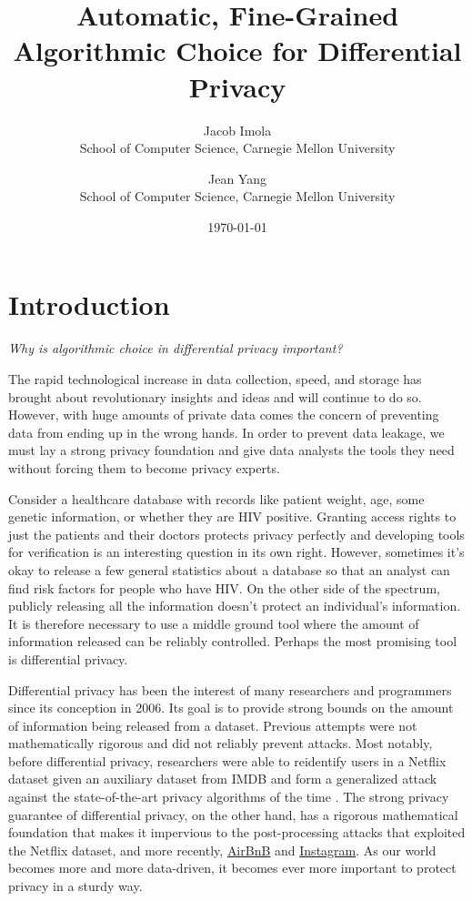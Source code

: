 \documentclass[11pt]{article}
\title{Automatic, Fine-Grained Algorithmic Choice for Differential Privacy}
\date{\today}
\author{Jacob Imola\\ School of Computer Science, Carnegie Mellon University\and Jean Yang\\ School of Computer Science, Carnegie Mellon University}
\begin{document}
\maketitle
\section{Introduction}
\emph{Why is algorithmic choice in differential privacy important?}

The rapid technological increase in data collection, speed, and storage has brought about revolutionary insights and ideas and will continue to do so. However, with huge amounts of private data comes the concern of preventing data from ending up in the wrong hands. In order to prevent data leakage, we must lay a strong privacy foundation and give data analysts the tools they need without forcing them to become privacy experts.

Consider a healthcare database with records like patient weight, age, some genetic information, or whether they are HIV positive. Granting access rights to just the patients and their doctors protects privacy perfectly and developing tools for verification is an interesting question in its own right. However, sometimes it's okay to release a few general statistics about a database so that an analyst can find risk factors for people who have HIV. On the other side of the spectrum, publicly releasing all the information doesn't protect an individual's information. It is therefore necessary to use a middle ground tool where the amount of information released can be reliably controlled. Perhaps the most promising tool is differential privacy.

Differential privacy has been the interest of many researchers and programmers since its conception in 2006. Its goal is to provide strong bounds on the amount of information being released from a dataset. Previous attempts were not mathematically rigorous and did not reliably prevent attacks. Most notably, before differential privacy, researchers were able to reidentify users in a Netflix dataset given an auxiliary dataset from IMDB and form a generalized attack against the state-of-the-art privacy algorithms of the time \cite{Narayanan:2006}. The strong privacy guarantee of differential privacy, on the other hand, has a rigorous mathematical foundation that makes it impervious to the post-processing attacks that exploited the Netflix dataset, and more recently, \href{https://hackernoon.com/how-to-rob-an-airbnb-252e7e7eda44}{AirBnB} and \href{https://gizmodo.com/this-is-almost-certainly-james-comey-s-twitter-account-1793843641}{Instagram}. As our world becomes more and more data-driven, it becomes ever more important to protect privacy in a sturdy way.
\end{document}
